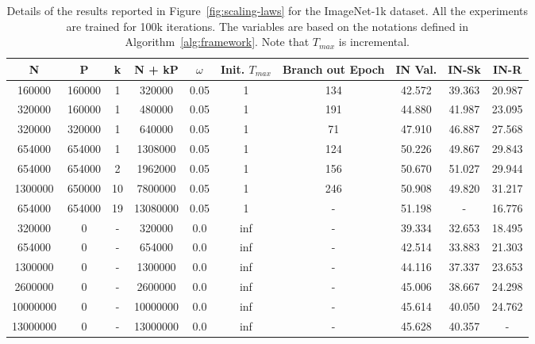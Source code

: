 \begin{table}[h]
\centering
\begin{tabular}{cccccccccc}
    \toprule
    \textbf{N} & \textbf{P} & \textbf{k} & \textbf{N + kP} & \textbf{$\omega$} & \textbf{Init. $T_{max}$} & \textbf{Branch out Epoch} & \textbf{IN Val.} & \textbf{IN-Sk} & \textbf{IN-R} \\
    \midrule
    160000  & 160000  & 1  & 320000  & 0.05 & 1  & 134  & 42.572 & 39.363 & 20.987 \\
    320000  & 160000  & 1  & 480000  & 0.05 & 1  & 191  & 44.880 & 41.987 & 23.095 \\
    320000  & 320000  & 1  & 640000  & 0.05 & 1  & 71   & 47.910 & 46.887 & 27.568 \\
    654000  & 654000  & 1  & 1308000 & 0.05 & 1  & 124  & 50.226 & 49.867 & 29.843 \\
    654000  & 654000  & 2  & 1962000 & 0.05 & 1  & 156  & 50.670 & 51.027 & 29.944 \\
    1300000 & 650000  & 10 & 7800000 & 0.05 & 1  & 246  & 50.908 & 49.820 & 31.217 \\
    654000  & 654000  & 19 & 13080000 & 0.05 & 1  & -    & 51.198 & -      & 16.776 \\
    320000  & 0       & -  & 320000  & 0.0  & inf & -    & 39.334 & 32.653 & 18.495 \\
    654000  & 0       & -  & 654000  & 0.0  & inf & -    & 42.514 & 33.883 & 21.303 \\
    1300000 & 0       & -  & 1300000 & 0.0  & inf & -    & 44.116 & 37.337 & 23.653 \\
    2600000 & 0       & -  & 2600000 & 0.0  & inf & -    & 45.006 & 38.667 & 24.298 \\
    10000000 & 0      & -  & 10000000 & 0.0  & inf & -   & 45.614 & 40.050 & 24.762 \\
    13000000 & 0      & -  & 13000000 & 0.0  & inf & -   & 45.628 & 40.357 & - \\
    \bottomrule
\end{tabular}

\caption{Details of the results reported in Figure~\ref{fig:scaling-laws} for the ImageNet-1k dataset. All the experiments are trained for 100k iterations. The variables are based on the notations defined in Algorithm~\ref{alg:framework}. Note that $T_{max}$ is incremental.}
\label{tab:experiment_results}
\end{table}


